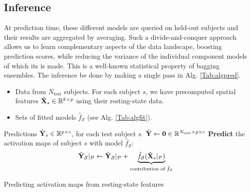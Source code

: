 \subsection{Inference}
At prediction time, these different models are queried on held-out subjects and their results are
  aggregated by averaging. Such a divide-and-conquer approach allows us to learn
  complementary aspects of the data landscape, boosting prediction scores, while reducing the
  variance of the individual
  component models of which its is made. 
%
  This is a well-known statistical property of bagging
  ensembles. The inference be done by making a single pass in Alg. \ref{Tab:algpred}.


\begin{algorithm}
  \begin{algorithmic}[1]
    \Require
    \begin{itemize}
    \item Data from $N_{\text{test}}$ subjects. For each subject $s$, we have
      precomputed spatial features $\tilde{\mathbf{X}}_s \in \mathbb R^{k \times p}$ using their resting-state
      data.
    \item 
       Sets of fitted models $\hat{f}_{\mathcal S}$ (see Alg. \ref{Tab:algfit}).
     \end{itemize}
    \Ensure Predictions $\hat{\mathbf{Y}}_s \in \mathbb R^{p \times c}$, for each test subject $s$.
  \State $\hat{\mathbf{Y}} \leftarrow \boldsymbol{0} \in \mathbb R^{N_{\text{test}} \times p \times c}$
  \State \textbf{Predict} the activation maps of subject $s$ with model $\hat{f}_{\mathcal S}$:
  $$\hat{\mathbf{Y}}_{\mathcal S}|_{\mathcal P} \leftarrow \hat{\mathbf{Y}}_{\mathcal S}|_{\mathcal P} +
  \underbrace{\hat{f}_{\mathcal S}(\tilde{\mathbf{X}}_s|_{\mathcal P})}_{\text{contribution of } \hat{f}_{\mathcal S}}$$
  \EndParFor
  \EndParFor
  \EndParFor
\end{algorithmic}
\caption{Predicting activation maps from resting-state features}
\label{Tab:algpred}
\end{algorithm}

